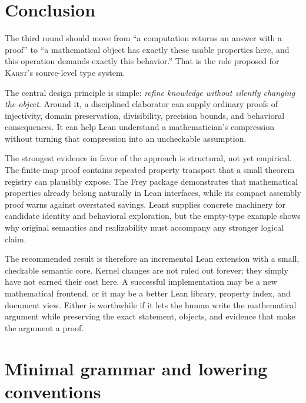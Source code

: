 \documentclass[11pt,letterpaper]{article}
\newcommand{\Karst}{\textsc{Karst}}
\theoremstyle{remark}
\begin{document}
\section{Conclusion}
The third round should move from ``a computation returns an answer with a
proof'' to ``a mathematical object has exactly these usable properties here,
and this operation demands exactly this behavior.'' That is the role proposed
for \Karst's source-level type system.

The central design principle is simple: \emph{refine knowledge without silently
changing the object}. Around it, a disciplined elaborator can supply ordinary
proofs of injectivity, domain preservation, divisibility, precision bounds, and
behavioral consequences. It can help Lean understand a mathematician's
compression without turning that compression into an uncheckable assumption.

The strongest evidence in favor of the approach is structural, not yet
empirical. The finite-map proof contains repeated property transport that a
small theorem registry can plausibly expose. The Frey package demonstrates
that mathematical properties already belong naturally in Lean interfaces,
while its compact assembly proof warns against overstated savings. Leant
supplies concrete machinery for candidate identity and behavioral exploration,
but the empty-type example shows why original semantics and realizability
must accompany any stronger logical claim.

The recommended result is therefore an incremental Lean extension with a
small, checkable semantic core. Kernel changes are not ruled out forever;
they simply have not earned their cost here. A successful implementation may
be a new mathematical frontend, or it may be a better Lean library, property
index, and document view. Either is worthwhile if it lets the human write the
mathematical argument while preserving the exact statement, objects, and
evidence that make the argument a proof.

\appendix
\section{Minimal grammar and lowering conventions}\label{app:grammar}
\end{document}
